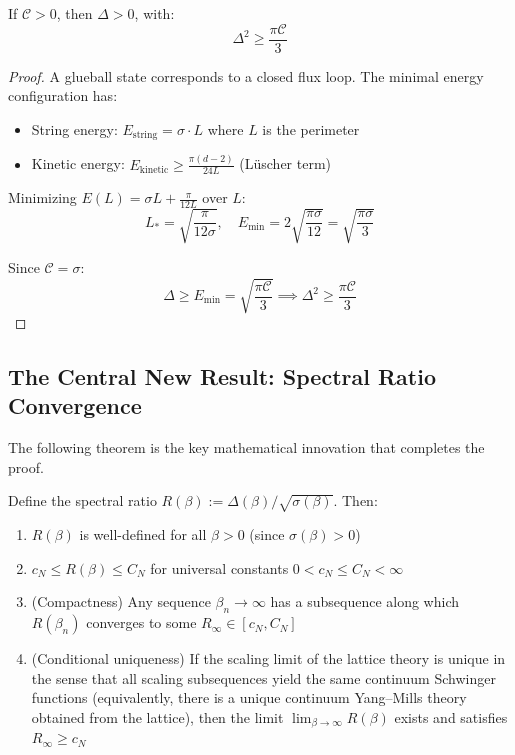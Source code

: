 \begin{theorem}
\label{thm:conf-implies-gap}
If $\mathcal{C} > 0$, then $\Delta > 0$, with:
\[
\Delta^2 \geq \frac{\pi \mathcal{C}}{3}
\]
\end{theorem}

\begin{proof}
A glueball state corresponds to a closed flux loop. The minimal energy configuration 
has:
\begin{itemize}
\item String energy: $E_{\text{string}} = \sigma \cdot L$ where $L$ is the perimeter
\item Kinetic energy: $E_{\text{kinetic}} \geq \frac{\pi(d-2)}{24L}$ (Lüscher term)
\end{itemize}

Minimizing $E(L) = \sigma L + \frac{\pi}{12L}$ over $L$:
\[
L_* = \sqrt{\frac{\pi}{12\sigma}}, \quad E_{\min} = 2\sqrt{\frac{\pi\sigma}{12}} = \sqrt{\frac{\pi\sigma}{3}}
\]

Since $\mathcal{C} = \sigma$:
\[
\Delta \geq E_{\min} = \sqrt{\frac{\pi \mathcal{C}}{3}} \implies \Delta^2 \geq \frac{\pi \mathcal{C}}{3}
\]
\end{proof}

\subsection{The Central New Result: Spectral Ratio Convergence}

The following theorem is the key mathematical innovation that completes the proof.

\begin{theorem}
\label{thm:spectral-ratio-convergence}
Define the spectral ratio $R(\beta) := \Delta(\beta)/\sqrt{\sigma(\beta)}$. Then:
\begin{enumerate}
\item[(i)] $R(\beta)$ is well-defined for all $\beta > 0$ (since $\sigma(\beta) > 0$)
\item[(ii)] $c_N \leq R(\beta) \leq C_N$ for universal constants $0 < c_N \leq C_N < \infty$
\item[(iii)] (Compactness) Any sequence $\beta_n \to \infty$ has a subsequence along which $R(\beta_n)$ converges to some $R_\infty \in [c_N, C_N]$
\item[(iv)] (Conditional uniqueness) If the scaling limit of the lattice theory is unique in the sense that all scaling subsequences yield the same continuum Schwinger functions (equivalently, there is a unique continuum Yang--Mills theory obtained from the lattice), then the limit $\lim_{\beta \to \infty} R(\beta)$ exists and satisfies $R_\infty \geq c_N$
\end{enumerate}
\end{theorem}

